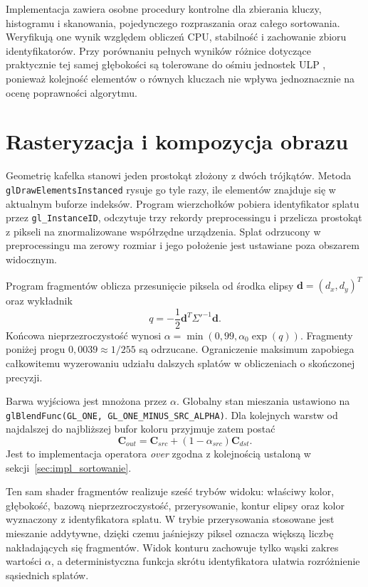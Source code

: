 Implementacja zawiera osobne procedury kontrolne dla zbierania kluczy, histogramu i skanowania, pojedynczego rozpraszania oraz całego sortowania. Weryfikują one wynik względem obliczeń CPU,  stabilność i zachowanie zbioru identyfikatorów. Przy porównaniu pełnych wyników różnice dotyczące praktycznie tej samej głębokości są tolerowane do ośmiu jednostek ULP , ponieważ kolejność elementów o równych kluczach nie wpływa jednoznacznie na ocenę poprawności algorytmu.
\section{Rasteryzacja i kompozycja obrazu}
\label{sec:impl_rasteryzacja}

Geometrię kafelka stanowi jeden prostokąt złożony z dwóch trójkątów. Metoda \texttt{glDrawElementsInstanced} rysuje go tyle razy, ile elementów znajduje się w aktualnym buforze indeksów. Program wierzchołków pobiera identyfikator splatu przez \texttt{gl\_InstanceID}, odczytuje trzy rekordy preprocessingu i przelicza prostokąt z pikseli na znormalizowane współrzędne urządzenia. Splat odrzucony w preprocessingu ma zerowy rozmiar i jego położenie jest ustawiane poza obszarem widocznym.

Program fragmentów oblicza przesunięcie piksela od środka elipsy
$\mathbf{d}=(d_x,d_y)^T$ oraz wykładnik
\begin{equation}
  q=-\frac{1}{2}\mathbf{d}^{T}\Sigma'^{-1}\mathbf{d}.
  \label{eq:impl_fragment}
\end{equation}
Końcowa nieprzezroczystość wynosi
$\alpha=\min(0{,}99,\alpha_0\exp(q))$. Fragmenty poniżej progu
$0{,}0039\approx1/255$ są odrzucane. Ograniczenie maksimum zapobiega całkowitemu wyzerowaniu udziału dalszych splatów w obliczeniach o skończonej precyzji.

Barwa wyjściowa jest mnożona przez $\alpha$. Globalny stan mieszania ustawiono na \texttt{glBlendFunc(GL\_ONE, GL\_ONE\_MINUS\_SRC\_ALPHA)}. Dla kolejnych warstw od najdalszej do najbliższej bufor koloru przyjmuje zatem postać
\begin{equation}
  \mathbf{C}_{out}=\mathbf{C}_{src}+ (1-\alpha_{src})\mathbf{C}_{dst}.
  \label{eq:impl_blending}
\end{equation}
Jest to implementacja operatora \emph{over} zgodna z kolejnością ustaloną w sekcji~\ref{sec:impl_sortowanie}.

Ten sam shader fragmentów realizuje sześć trybów widoku: właściwy kolor, głębokość, bazową nieprzezroczystość, przerysowanie, kontur elipsy oraz kolor wyznaczony z identyfikatora splatu. W trybie przerysowania stosowane jest mieszanie addytywne, dzięki czemu jaśniejszy piksel oznacza większą liczbę nakładających się fragmentów. Widok konturu zachowuje tylko wąski zakres wartości $\alpha$, a deterministyczna funkcja skrótu identyfikatora ułatwia rozróżnienie sąsiednich splatów.

